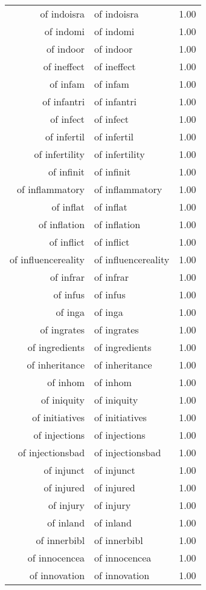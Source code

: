 \begin{table}[ht]
\begin{tabular}{rlr}
  of indoisra & of indoisra & 1.00 \\ 
  of indomi & of indomi & 1.00 \\ 
  of indoor & of indoor & 1.00 \\ 
  of ineffect & of ineffect & 1.00 \\ 
  of infam & of infam & 1.00 \\ 
  of infantri & of infantri & 1.00 \\ 
  of infect & of infect & 1.00 \\ 
  of infertil & of infertil & 1.00 \\ 
  of infertility & of infertility & 1.00 \\ 
  of infinit & of infinit & 1.00 \\ 
  of inflammatory & of inflammatory & 1.00 \\ 
  of inflat & of inflat & 1.00 \\ 
  of inflation & of inflation & 1.00 \\ 
  of inflict & of inflict & 1.00 \\ 
  of influencereality & of influencereality & 1.00 \\ 
  of infrar & of infrar & 1.00 \\ 
  of infus & of infus & 1.00 \\ 
  of inga & of inga & 1.00 \\ 
  of ingrates & of ingrates & 1.00 \\ 
  of ingredients & of ingredients & 1.00 \\ 
  of inheritance & of inheritance & 1.00 \\ 
  of inhom & of inhom & 1.00 \\ 
  of iniquity & of iniquity & 1.00 \\ 
  of initiatives & of initiatives & 1.00 \\ 
  of injections & of injections & 1.00 \\ 
  of injectionsbad & of injectionsbad & 1.00 \\ 
  of injunct & of injunct & 1.00 \\ 
  of injured & of injured & 1.00 \\ 
  of injury & of injury & 1.00 \\ 
  of inland & of inland & 1.00 \\ 
  of innerbibl & of innerbibl & 1.00 \\ 
  of innocencea & of innocencea & 1.00 \\ 
  of innovation & of innovation & 1.00 \\ 

\end{tabular}
\end{table}

